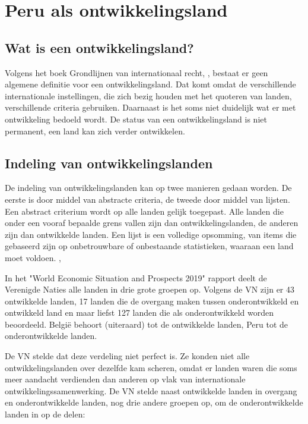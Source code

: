 \section{Peru als ontwikkelingsland}
\subsection{Wat is een ontwikkelingsland?}
Volgens het boek Grondlijnen van internationaal recht, \autocite{MarcJ.Bossuyt2005}, bestaat er geen algemene definitie voor een ontwikkelingsland. Dat komt omdat de verschillende internationale instellingen, die zich bezig houden met het quoteren van landen, verschillende criteria gebruiken. Daarnaast is het soms niet duidelijk wat er met ontwikkeling bedoeld wordt.
De status van een ontwikkelingsland is niet permanent, een land kan zich verder ontwikkelen.

\subsection{Indeling van ontwikkelingslanden}
De indeling van ontwikkelingslanden kan op twee manieren gedaan worden. De eerste is door middel van abstracte criteria, de tweede door middel van lijsten. Een abstract criterium wordt op alle landen gelijk toegepast. Alle landen die onder een vooraf bepaalde grens vallen zijn dan ontwikkelingslanden, de anderen zijn dan ontwikkelde landen. Een lijst is een volledige opsomming, van items die gebaseerd zijn op onbetrouwbare of onbestaande statistieken, waaraan een land moet voldoen. \autocite{MarcJ.Bossuyt2005},

In het "World Economic Situation and Prospects 2019" rapport \autocite{unitednations2019} deelt de Verenigde Naties alle landen in drie grote groepen op. Volgens de VN zijn er 43 ontwikkelde landen, 17 landen die de overgang maken tussen onderontwikkeld en ontwikkeld land en maar liefst 127 landen die als onderontwikkeld worden beoordeeld. België behoort (uiteraard) tot de ontwikkelde landen, Peru tot de onderontwikkelde landen. \autocite{unitednations2019}

De VN stelde dat deze verdeling niet perfect is. Ze konden niet alle ontwikkelingslanden over dezelfde kam scheren, omdat er landen waren die soms meer aandacht verdienden dan anderen op vlak van internationale ontwikkelingssamenwerking. De VN stelde naast ontwikkelde landen in overgang en onderontwikkelde landen, nog drie andere groepen op, om de onderontwikkelde landen in op de delen: 


